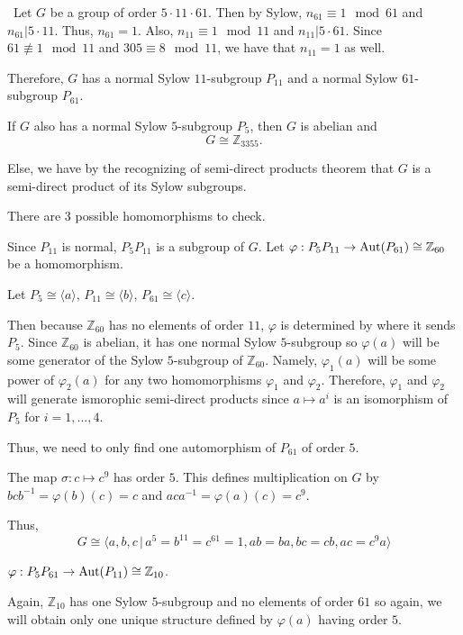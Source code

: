 \documentclass[12pt]{AlgebraQual}
\begin{document}
\begin{solution}$\,$
Let $G$ be a group of order $5\cdot 11\cdot 61.$ Then by Sylow, $n_{61}\equiv 1\mod 61$ and $n_{61}|5\cdot 11$. Thus, $n_{61}=1$. Also, $n_{11}\equiv 1\mod 11$ and $n_{11}|5\cdot 61$. Since $61\not\equiv 1\mod 11$ and $305\equiv 8\mod 11$, we have that $n_{11}=1$ as well.

Therefore, $G$ has a normal Sylow $11$-subgroup $P_{11}$ and a normal Sylow $61$-subgroup $P_{61}$.

 If $G$ also has a normal Sylow $5$-subgroup $P_5$, then $G$ is abelian and $$G\cong\mathbb{Z}_{3355}.$$

Else, we have by the recognizing of semi-direct products theorem that $G$ is a semi-direct product of its Sylow subgroups.

There are $3$ possible homomorphisms to check.

 Since $P_{11}$ is normal, $P_5P_{11}$ is a subgroup of $G$. Let $\varphi:P_5P_{11}\to\text{Aut}(P_{61})\cong\mathbb{Z}_{60}$ be a homomorphism.

Let $P_5\cong\langle a\rangle$, $P_{11}\cong\langle b\rangle$, $P_{61}\cong\langle c\rangle.$

Then because $\mathbb{Z}_{60}$ has no elements of order $11$, $\varphi$ is determined by where it sends $P_5$. Since $\mathbb{Z}_{60}$ is abelian, it has one normal Sylow $5$-subgroup so $\varphi(a)$ will be some generator of the Sylow $5$-subgroup of $\mathbb{Z}_{60}$. Namely, $\varphi_1(a)$ will be some power of $\varphi_2(a)$ for any two homomorphisms $\varphi_1$ and $\varphi_2$. Therefore, $\varphi_1$ and $\varphi_2$ will generate ismorophic semi-direct products since $a\mapsto a^i$ is an isomorphism of $P_5$ for $i=1,...,4$.

Thus, we need to only find one automorphism of $P_{61}$ of order $5.$

The map $\sigma:c\mapsto c^9$ has order $5$. This defines multiplication on $G$ by $bcb^{-1}=\varphi(b)(c)=c$ and $aca^{-1}=\varphi(a)(c)=c^9$.

Thus, $$G\cong\langle a,b,c\,|\, a^5=b^{11}=c^{61}=1,ab=ba,bc=cb,ac=c^9a\rangle$$

 $\varphi:P_5P_{61}\to\text{Aut}(P_{11})\cong \mathbb{Z}_{10}$.

Again, $\mathbb{Z}_{10}$ has one Sylow $5$-subgroup and no elements of order $61$ so again, we will obtain only one unique structure defined by $\varphi(a)$ having order $5$.


\end{solution}
\end{document}
